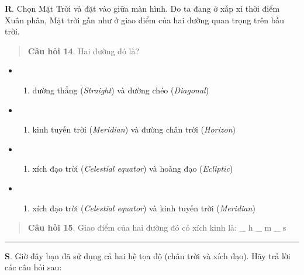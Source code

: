 \documentclass[
]{book}
\providecommand{\tightlist}{%
  \setlength{\itemsep}{0pt}\setlength{\parskip}{0pt}}
\begin{document}
\textbf{R}. Chọn Mặt Trời và đặt vào giữa màn hình. Do ta đang ở xấp xỉ thời điểm Xuân phân, Mặt trời gần như ở giao điểm của hai đường quan trọng trên bầu trời.

\begin{quote}
\textbf{Câu hỏi 14}. Hai đường đó là?
\end{quote}

\begin{itemize}
\tightlist
\item
  \begin{enumerate}
  \def\labelenumi{(\Alph{enumi})}
  \tightlist
  \item
    đường thẳng (\emph{Straight}) và đường chéo (\emph{Diagonal})\\
  \end{enumerate}
\item
  \begin{enumerate}
  \def\labelenumi{(\Alph{enumi})}
  \setcounter{enumi}{1}
  \tightlist
  \item
    kinh tuyến trời (\emph{Meridian}) và đường chân trời (\emph{Horizon})\\
  \end{enumerate}
\item
  \begin{enumerate}
  \def\labelenumi{(\Alph{enumi})}
  \setcounter{enumi}{2}
  \tightlist
  \item
    xích đạo trời (\emph{Celestial equator}) và hoàng đạo (\emph{Ecliptic})\\
  \end{enumerate}
\item
  \begin{enumerate}
  \def\labelenumi{(\Alph{enumi})}
  \setcounter{enumi}{3}
  \tightlist
  \item
    xích đạo trời (\emph{Celestial equator}) và kinh tuyến trời (\emph{Meridian})
  \end{enumerate}
\end{itemize}

\begin{quote}
\textbf{Câu hỏi 15}. Giao điểm của hai đường đó có xích kinh là:
\_ h
\_ m
\_ s
\end{quote}

\begin{center}\rule{0.5\linewidth}{0.5pt}\end{center}

\textbf{S}. Giờ đây bạn đã sử dụng cả hai hệ tọa độ (chân trời và xích đạo). Hãy trả lời các câu hỏi sau:
\end{document}
